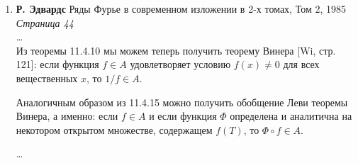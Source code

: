 \documentclass[12pt]{extarticle}
\theoremstyle{definition}
\begin{document}
\begin{enumerate}
\begin{proof}
				Возьмём произвольный $\chi\in\Omega$. Пусть $\chi(e^{it})=\lambda$. Тогда, конечно, $\chi(e^{-it})=1/\lambda$, а значит, $\chi(e^{int})=\lambda^n$ для всех $n\in\mathbb{Z}$. Но так как $||e^{it}||=||e^{-it}||=1$, то в силу Предложения 1 выполнено $|\lambda|,|1/\lambda|\leq1$. Отсюда $|\lambda|=1$, и $\lambda=e^{is}$ для некоторого $s\in[0,2\pi)$. Но тогда для любой $f\in W$, разлагающейся в ряд $\sum_{n=-\infty}^\infty c_n e^{int}$, абсолютная сходимость этого ряда влечёт
				$$\chi(f)=\sum_{n=-\infty}^\infty c_n \chi(e^{ins})=f(s)$$
				Таким образом, в терминах преобразования Гельфанда $\hat{f}(\chi)=f(s)$. Поэтому, раз $f$ нигде не равна нулю, то же верно и для функции $\hat{f}$ на $\Omega$. Но тогда, в силу утверждения $(ii)$ теоремы Гельфанда, $f$~--- обратимый элемент алгебры $W$. Это как раз то, что нам нужно.
			\end{proof}
		...
		\item \textbf{Р. Эдвардс} Ряды Фурье в современном изложении в 2-х томах, Том 2, 1985\\
		\textit{Страница 44}\\
		\dots\\
		Из теоремы 11.4.10 мы можем теперь получить теорему Винера [Wi, стр. 121]: если функция $f\in A$ удовлетворяет условию $f(x)\neq 0$ для всех вещественных $x$, то $1/f\in A$.

		Аналогичным образом из 11.4.15 можно получить обобщение Леви теоремы Винера, а именно: если $f\in A$ и если функция $\Phi$ определена и аналитична на некотором открытом множестве, содержащем $f(T)$, то $\Phi\circ f\in A$.

		\dots
	\end{enumerate}
\end{document}
